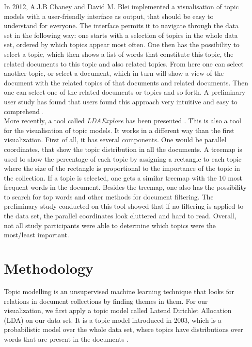 \documentclass[11pt]{article}
\begin{document}
In 2012, A.J.B Chaney and David M. Blei \cite{Chaney2012VisualizingTM} implemented a visualisation of topic models with a user-friendly interface as output, that should be easy to understand for everyone. The interface permits it to navigate through the data set in the following way: one starts with a selection of topics in the whole data set, ordered by which topics appear most often. One then has the possibility to select a topic, which then shows a list of words that constitute this topic, the related documents to this topic and also related topics. From here one can select another topic, or select a document, which in turn will show a view of the document with the related topics of that documents and related documents. Then one can select one of the related documents or topics and so forth. A preliminary user study has found that users found this approach very intuitive and easy to comprehend \cite{Chaney2012VisualizingTM}.\\
More recently, a tool called \textit{LDAExplore} has been presented \cite{Ganesan2015LDAExploreVT}. This is also a tool for the visualisation of topic models. It works in a different way than the first visualization. First of all, it has several components. One would be parallel coordinates, that show the topic distribution in all the documents. A treemap is used to show the percentage of each topic by assigning a rectangle to each topic where the size of the rectangle is proportional to the importance of the topic in the collection. If a topic is selected, one gets a similar treemap with the 10 most frequent words in the document. Besides the treemap, one also has the possibility to search for top words and other methods for document filtering. The preliminary study conducted on this tool \cite{Ganesan2015LDAExploreVT} showed that if no filtering is applied to the data set, the parallel coordinates look cluttered and hard to read. Overall, not all study participants were able to determine which topics were the most/least important.

\section{Methodology}
%

Topic modelling is an unsupervised machine learning technique that looks for relations in document collections by finding themes in them. For our visualization, we first apply a topic model called Latend Dirichlet Allocation (LDA) on our data set. It is a topic model introduced in 2003, which is a probabilistic model over the whole data set, where topics have distributions over words that are present in the documents \cite{Blei03latentdirichlet}.
\end{document}
